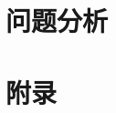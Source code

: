 \documentclass[UTF8,a4paper]{ctexart}
\numberwithin{equation}{section}%
\numberwithin{table}{section}
\numberwithin{figure}{section}
\begin{document}
\section{问题分析}



\section*{附录}
%

%
%
\end{document}

